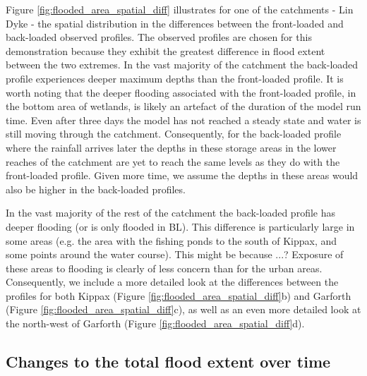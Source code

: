 \documentclass[APA,Times2COL]{WileyNJDv5}
\begin{document}
Figure \ref{fig:flooded_area_spatial_diff} illustrates for one of the catchments - Lin Dyke - the spatial distribution in the differences between the front-loaded and back-loaded observed profiles. The observed profiles are chosen for this demonstration because they exhibit the greatest difference in flood extent between the two extremes. In the vast majority of the catchment the back-loaded profile experiences deeper maximum depths than the front-loaded profile. It is worth noting that the deeper flooding associated with the front-loaded profile, in the bottom area of wetlands, is likely an artefact of the duration of the model run time. Even after three days the model has not reached a steady state and water is still moving through the catchment. Consequently, for the back-loaded profile where the rainfall arrives later the depths in these storage areas in the lower reaches of the catchment are yet to reach the same levels as they do with the front-loaded profile. Given more time, we assume the depths in these areas would also be higher in the back-loaded profiles. 

In the vast majority of the rest of the catchment the back-loaded profile has deeper flooding (or is only flooded in BL). This difference is particularly large in some areas (e.g. the area with the fishing ponds to the south of Kippax, and some points around the water course). This might be because ...? Exposure of these areas to flooding is clearly of less concern than for the urban areas. Consequently, we include a more detailed look at the differences between the profiles for both Kippax (Figure \ref{fig:flooded_area_spatial_diff}b) and Garforth (Figure \ref{fig:flooded_area_spatial_diff}c), as well as an even more detailed look at the north-west of Garforth (Figure \ref{fig:flooded_area_spatial_diff}d).


\subsection{Changes to the total flood extent over time}\label{subsec:flood_over_time}
\end{document}
